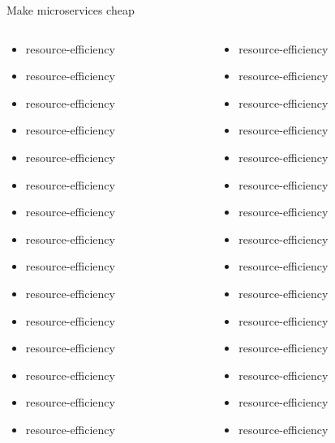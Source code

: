 \documentclass{beamer}
\begin{document}
\begin{frame}{Make microservices cheap}
\begin{columns}
\begin{column}{0.36\textwidth}
\begin{itemize}
                \item resource-efficiency
                \item resource-efficiency
                \item resource-efficiency
                \item resource-efficiency
                \item resource-efficiency
                \item resource-efficiency
                \item resource-efficiency
                \item resource-efficiency
                \item resource-efficiency
                \item resource-efficiency
                \item resource-efficiency
                \item resource-efficiency
                \item resource-efficiency
                \item resource-efficiency
                \item resource-efficiency
            \end{itemize}
        \end{column}
        \begin{column}{0.36\textwidth}
            \begin{itemize}
                \item resource-efficiency
                \item resource-efficiency
                \item resource-efficiency
                \item resource-efficiency
                \item resource-efficiency
                \item resource-efficiency
                \item resource-efficiency
                \item resource-efficiency
                \item resource-efficiency
                \item resource-efficiency
                \item resource-efficiency
                \item resource-efficiency
                \item resource-efficiency
                \item resource-efficiency
                \item resource-efficiency
            \end{itemize}
        \end{column}
    \end{columns}
\end{frame}
\end{document}
